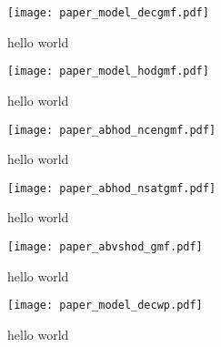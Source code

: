 \documentclass[12pt, preprint]{emulateapj}
\begin{document}
\begin{figure*}
\begin{center}
\texttt{[image: paper\_model\_decgmf.pdf]}
\caption{hello world}
\label{fig:abc_converge}
\end{center}
\end{figure*}
\begin{figure*}
\begin{center}
\texttt{[image: paper\_model\_hodgmf.pdf]}
\caption{hello world}
\label{fig:abc_converge}
\end{center}
\end{figure*}
\begin{figure*}
\begin{center}
\texttt{[image: paper\_abhod\_ncengmf.pdf]}
\caption{hello world}
\label{fig:abc_converge}
\end{center}
\end{figure*}
\begin{figure*}
\begin{center}
\texttt{[image: paper\_abhod\_nsatgmf.pdf]}
\caption{hello world}
\label{fig:abc_converge}
\end{center}
\end{figure*}
\begin{figure*}
\begin{center}
\texttt{[image: paper\_abvshod\_gmf.pdf]}
\caption{hello world}
\label{fig:abc_converge}
\end{center}
\end{figure*}
\begin{figure*}
\begin{center}
\texttt{[image: paper\_model\_decwp.pdf]}
\caption{hello world}
\label{fig:abc_converge}
\end{center}
\end{figure*}
\end{document}
